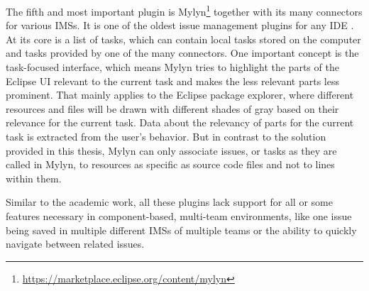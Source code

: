 The fifth and most important plugin is Mylyn\footnote{\url{https://marketplace.eclipse.org/content/mylyn}} together with its many connectors for various \glspl{IMS}.
It is one of the oldest issue management plugins for any \gls{IDE} \cite{janak2009issue}.
At its core is a list of tasks, which can contain local tasks stored on the computer and tasks provided by one of the many connectors.
One important concept is the task-focused interface, which means Mylyn tries to highlight the parts of the \gls{Eclipse} \gls{UI} relevant to the current task and makes the less relevant parts less prominent.
That mainly applies to the \gls{Eclipse} package explorer, where different resources and files will be drawn with different shades of gray based on their relevance for the current task.
Data about the relevancy of parts for the current task is extracted from the user's behavior.
But in contrast to the solution provided in this thesis, Mylyn can only associate issues, or tasks as they are called in Mylyn, to resources as specific as source code files and not to lines within them.

Similar to the academic work, all these plugins lack support for all or some features necessary in component-based, multi-team environments,
like one issue being saved in multiple different \glspl{IMS} of multiple teams or the ability to quickly navigate between related issues.

